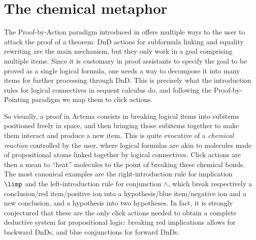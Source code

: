\section{The chemical metaphor}

The Proof-by-Action paradigm introduced in  offers multiple ways to
the user to attack the proof of a theorem: DnD actions for subformula linking
and equality rewriting are the main mechanism, but they only work in a goal
comprising multiple items. Since it is customary in proof assistants to specify
the goal to be proved as a single logical formula, one needs a way to decompose
it into many items for further processing through DnD. This is precisely what
the introduction rules for logical connectives in sequent calculus do, and
following the Proof-by-Pointing paradigm \cite{PbP} we map them to click
actions.

So visually, a proof in Actema consists in breaking logical items into subitems
positioned freely in space, and then bringing those subitems together to make
them interact and produce a new item. This is quite evocative of a
\emph{chemical reaction} controlled by the user, where logical formulas are akin
to molecules made of propositional atoms linked together by logical
connectives. Click actions are then a mean to
``heat'' molecules to the point of breaking these chemical bonds. The most
canonical examples are the right-introduction rule for implication $\limp$ and
the left-introduction rule for conjunction $\land$, which break respectively a
conclusion/red item/positive ion into a hypothesis/blue item/negative ion and a
new conclusion, and a hypothesis into two hypotheses. In fact, it is strongly
conjectured that these are the only click actions needed to obtain a complete
deductive system for propositional logic: breaking red implications allows for
backward DnDs, and blue conjunctions for forward DnDs.

